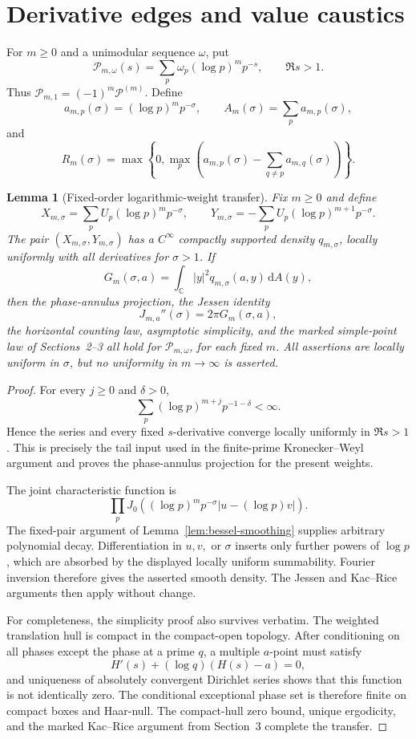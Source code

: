 \documentclass[11pt]{article}
\newtheorem{lemma}[theorem]{Lemma}
\theoremstyle{definition}
\theoremstyle{remark}
\newcommand{\cP}{\mathcal P}
\newcommand{\dd}{\,\mathrm d}
\newcommand{\C}{\mathbb C}
\begin{document}
\section{Derivative edges and value caustics}
\label{sec:derivative-caustics}

For $m\ge0$ and a unimodular sequence $\omega$, put
\[
 \cP_{m,\omega}(s)=
 \sum_p\omega_p(\log p)^mp^{-s},
 \qquad \Re s>1.
\tag{6.1}
\]
Thus $\cP_{m,1}=(-1)^m\cP^{(m)}$.  Define
\[
 a_{m,p}(\sigma)=(\log p)^mp^{-\sigma},
 \qquad
 A_m(\sigma)=\sum_pa_{m,p}(\sigma),
\tag{6.2}
\]
and
\[
 R_m(\sigma)=
 \max\left\{0,\max_p\left(a_{m,p}(\sigma)-
 \sum_{q\ne p}a_{m,q}(\sigma)\right)\right\}.
\tag{6.3}
\]

\begin{lemma}[Fixed-order logarithmic-weight transfer]
\label{lem:fixed-order-transfer}
Fix $m\ge0$ and define
\[
 X_{m,\sigma}=\sum_pU_p(\log p)^mp^{-\sigma},\qquad
 Y_{m,\sigma}=-\sum_pU_p(\log p)^{m+1}p^{-\sigma}.
\]
The pair $(X_{m,\sigma},Y_{m,\sigma})$ has a $C^\infty$ compactly supported
density $q_{m,\sigma}$, locally uniformly with all derivatives for $\sigma>1$.
If
\[
 G_m(\sigma,a)=\int_{\C}|y|^2q_{m,\sigma}(a,y)\dd A(y),
\]
then the phase-annulus projection, the Jessen identity
\[
 J_{m,a}''(\sigma)=2\pi G_m(\sigma,a),
\]
the horizontal counting law, asymptotic simplicity, and the marked simple-point
law of Sections~2--3 all hold for $\cP_{m,\omega}$, for each fixed $m$.
All assertions are locally uniform in $\sigma$, but no uniformity in
$m\to\infty$ is asserted.
\end{lemma}

\begin{proof}
For every $j\ge0$ and $\delta>0$,
\[
 \sum_p(\log p)^{m+j}p^{-1-\delta}<\infty.
\]
Hence the series and every fixed $s$-derivative converge locally uniformly in
$\Re s>1$.  This is precisely the tail input used in the finite-prime
Kronecker--Weyl argument and proves the phase-annulus projection for the present
weights.

The joint characteristic function is
\[
 \prod_pJ_0\!\left((\log p)^mp^{-\sigma}
                 |u-(\log p)v|\right).
\]
The fixed-pair argument of Lemma~\ref{lem:bessel-smoothing} supplies arbitrary
polynomial decay.  Differentiation in $u,v,$ or $\sigma$ inserts only further
powers of $\log p$, which are absorbed by the displayed locally uniform
summability.  Fourier inversion therefore gives the asserted smooth density.
The Jessen and Kac--Rice arguments then apply without change.

For completeness, the simplicity proof also survives verbatim.  The weighted
translation hull is compact in the compact-open topology.  After conditioning on
all phases except the phase at a prime $q$, a multiple $a$-point must satisfy
\[
 H'(s)+(\log q)(H(s)-a)=0,
\]
and uniqueness of absolutely convergent Dirichlet series shows that this function
is not identically zero.  The conditional exceptional phase set is therefore
finite on compact boxes and Haar-null.  The compact-hull zero bound, unique
ergodicity, and the marked Kac--Rice argument from Section~3 complete the transfer.
\end{proof}
\end{document}
